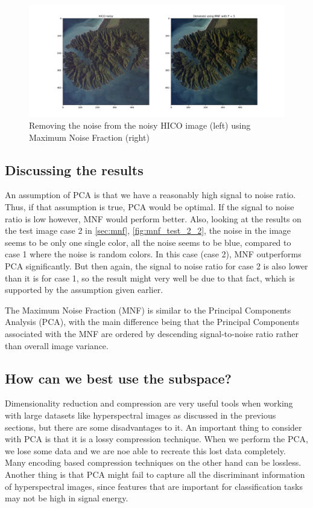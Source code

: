 \begin{figure}
    \centering
    \includegraphics[width=\textwidth]{../fig/HICO_mnf.png}
    \caption{Removing the noise from the noisy HICO image (left) using Maximum Noise Fraction (right)}
    \label{fig:HICO_mnf}
\end{figure}


\subsection{Discussing the results}

An assumption of PCA is that we have a reasonably high signal to noise ratio. Thus, 
if that assumption is true, PCA would be optimal. If the signal to noise ratio is low 
however, MNF would perform better. Also, looking at the results on the test image 
case 2 in \cref{sec:mnf}, \cref{fig:mnf_test_2_2}, the noise in the image seems to be only one single color, 
all the noise seems to be blue, compared to case 1 where the noise is random colors. 
In this case (case 2), MNF outperforms PCA significantly. But then again, the signal 
to noise ratio for case 2 is also lower than it is for case 1, so the result might 
very well be due to that fact, which is supported by the assumption given earlier. 

The Maximum Noise Fraction (MNF) is similar to the Principal Components Analysis (PCA), 
with the main difference being that the Principal Components associated with the MNF are 
ordered by descending signal-to-noise ratio rather than overall image variance. 

\subsection{How can we best use the subspace?}

Dimensionality reduction and compression are very useful tools when working with 
large datasets like hyperspectral images as discussed in the previous sections, 
but there are some disadvantages to it. An important thing to consider with PCA is 
that it is a lossy compression technique. 
When we perform the PCA, we lose some data and we are noe able to recreate this lost 
data completely. Many encoding based compression techniques on the other hand can be 
lossless. Another thing is that PCA might fail to capture all the discriminant 
information of hyperspectral images, since features that are important for classification 
tasks may not be high in signal energy. \cite{hybrid_compression}


